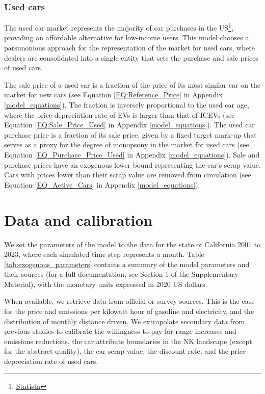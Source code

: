 \documentclass[12pt]{article}
\begin{document}
	\subsubsection{Used cars} \label{Model:Used_Cars}
    The used car market represents the majority of car purchases in the US\footnote{\href{https://www.statista.com/statistics/183713/value-of-us-passenger-cas-sales-and-leases-since-1990/}{Statista}}, providing an affordable alternative for low-income users. This model chooses a parsimonious approach for the representation of the market for used cars, where dealers are consolidated into a single entity that sets the purchase and sale prices of used cars.
	
	The sale price of a used car is a fraction of the price of its most similar car on the market for new cars (see Equation \ref{EQ:Reference_Price} in Appendix \ref{model_equations}). The fraction is inversely proportional to the used car age, where the price depreciation rate of EVs is larger than that of ICEVs \citep{SCHLOTER20222Depreciation} (see Equation \ref{EQ:Sale_Price_Used} in Appendix \ref{model_equations}). The used car purchase price is a fraction of its sale price, given by a fixed target mark-up that serves as a proxy for the degree of monopsony in the market for used cars (see Equation \ref{EQ_Purchase_Price_Used} in Appendix \ref{model_equations}). Sale and purchase prices have an exogenous lower bound representing the car's scrap value. Cars with prices lower than their scrap value are removed from circulation (see Equation \ref{EQ_Active_Cars} in Appendix \ref{model_equations}). 
	
	\section{Data and calibration} \label{Sec_Cal_Val}
	We set the parameters of the model to the data for the state of California 2001 to 2023, where each simulated time step represents a month. Table \ref{tab:exogenous_parameters} contains a summary of the model parameters and their sources (for a full documentation, see Section 1 of the Supplementary Material), with the monetary units expressed in 2020 US dollars. 
    
    When available, we retrieve data from official or survey sources. This is the case for the price and emissions per kilowatt hour of gasoline and electricity, and the distribution of monthly distance driven. We extrapolate secondary data from previous studies to calibrate the willingness to pay for range increases and emissions reductions, the car attribute boundaries in the NK landscape (except for the abstract quality), the car scrap value, the discount rate, and the price depreciation rate of used cars.
\end{document}
